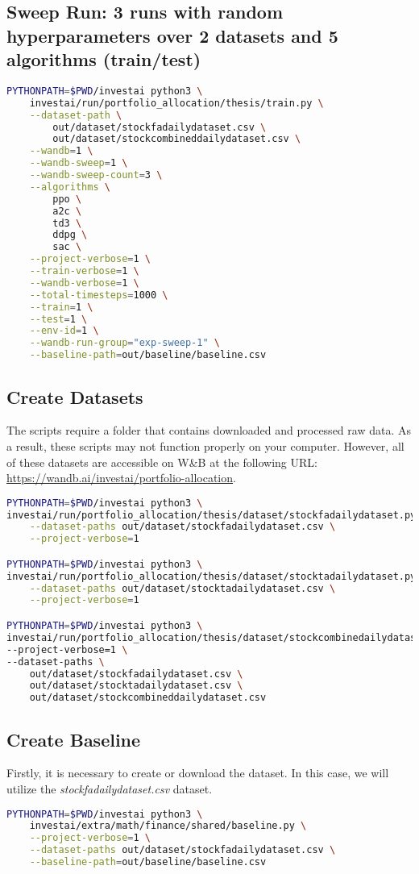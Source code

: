 \documentclass[../xlapes02]{subfiles}
\begin{document}
    \subsection{Sweep Run: 3 runs with random hyperparameters over 2 datasets and 5 algorithms (train/test)}
    \begin{lstlisting}[language=bash]
PYTHONPATH=$PWD/investai python3 \
    investai/run/portfolio_allocation/thesis/train.py \
    --dataset-path \
        out/dataset/stockfadailydataset.csv \
        out/dataset/stockcombineddailydataset.csv \
    --wandb=1 \
    --wandb-sweep=1 \
    --wandb-sweep-count=3 \
    --algorithms \
        ppo \
        a2c \
        td3 \
        ddpg \
        sac \
    --project-verbose=1 \
    --train-verbose=1 \
    --wandb-verbose=1 \
    --total-timesteps=1000 \
    --train=1 \
    --test=1 \
    --env-id=1 \
    --wandb-run-group="exp-sweep-1" \
    --baseline-path=out/baseline/baseline.csv
    \end{lstlisting}

    \subsection{Create Datasets}
    The scripts require a folder that contains downloaded and processed raw data. As a result, these scripts may not function properly on your computer. However, all of these datasets are accessible on W\&B at the following URL: \url{https://wandb.ai/investai/portfolio-allocation}.
    \begin{lstlisting}[language=bash]
PYTHONPATH=$PWD/investai python3 \
investai/run/portfolio_allocation/thesis/dataset/stockfadailydataset.py \
    --dataset-paths out/dataset/stockfadailydataset.csv \
    --project-verbose=1

PYTHONPATH=$PWD/investai python3 \
investai/run/portfolio_allocation/thesis/dataset/stocktadailydataset.py \
    --dataset-paths out/dataset/stocktadailydataset.csv \
    --project-verbose=1

PYTHONPATH=$PWD/investai python3 \
investai/run/portfolio_allocation/thesis/dataset/stockcombinedailydataset.py \
--project-verbose=1 \
--dataset-paths \
    out/dataset/stockfadailydataset.csv \
    out/dataset/stocktadailydataset.csv \
    out/dataset/stockcombineddailydataset.csv
    \end{lstlisting}

    \subsection{Create Baseline}
    Firstly, it is necessary to create or download the dataset. In this case, we will utilize the \emph{stockfadailydataset.csv} dataset.
    \begin{lstlisting}[language=bash]
PYTHONPATH=$PWD/investai python3 \
    investai/extra/math/finance/shared/baseline.py \
    --project-verbose=1 \
    --dataset-paths out/dataset/stockfadailydataset.csv \
    --baseline-path=out/baseline/baseline.csv
    \end{lstlisting}
\end{document}
